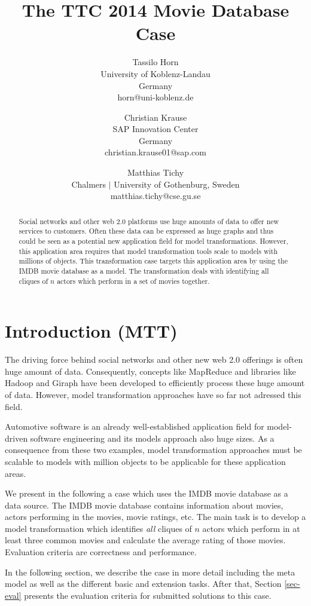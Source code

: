 \documentclass[a4paper,11pt]{article}
\title{The TTC 2014 Movie Database Case}
\author{
Tassilo Horn\\ University of Koblenz-Landau\\ Germany\\ horn@uni-koblenz.de
\and
Christian Krause\\ SAP Innovation Center\\ Germany\\ christian.krause01@sap.com
\and
Matthias Tichy\\ Chalmers $|$ University of Gothenburg, Sweden \\matthias.tichy@cse.gu.se
}
\begin{document}
\maketitle

\begin{abstract}
  Social networks and other web 2.0 platforms use huge amounts of data
  to offer new services to customers. Often these data can be
  expressed as huge graphs and thus could be seen as a potential new
  application field for model transformations. However, this
  application area requires that model transformation tools scale to
  models with millions of objects. This transformation case targets
  this application area by using the IMDB movie database as a
  model. The transformation deals with identifying all cliques of $n$
  actors which perform in a set of movies together.
  \end{abstract}
\vskip 32pt


\section{Introduction (MTT)}

The driving force behind social networks and other new web 2.0
offerings is often huge amount of data. Consequently, concepts like
MapReduce \cite{Dean08} and libraries like Hadoop \cite{Hadoop} and
Giraph \cite{Giraph} have been developed to efficiently process these
huge amount of data. However, model transformation approaches have so
far not adressed this field.

Automotive software is an already well-established application field
for model-driven software engineering and its models approach also
huge sizes. As a consequence from these two examples, model
transformation approaches must be scalable to models with million
objects to be applicable for these application areas.

We present in the following a case which uses the IMDB movie database
\cite{IMDBDATA} as a data source. The IMDB movie database contains
information about movies, actors performing in the movies, movie
ratings, etc. The main task is to develop a model transformation which
identifies \emph{all} cliques of $n$ actors which perform in at least
three common movies and calculate the average rating of those movies. Evaluation
criteria are correctness and performance.

In the following section, we describe the case in more detail
including the meta model as well as the different basic and extension
tasks. After that, Section \ref{sec-eval} presents the evaluation
criteria for submitted solutions to this case.
\end{document}
